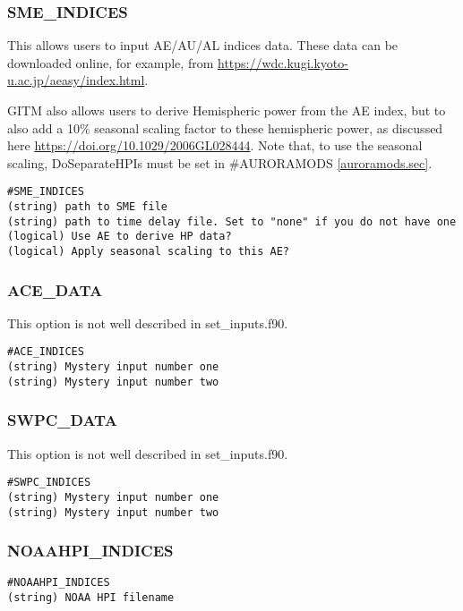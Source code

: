 \subsubsection{SME\_INDICES}
\label{sme_indices.sec}

This allows users to input AE/AU/AL indices data. These data can be downloaded online, for example, from \url{https://wdc.kugi.kyoto-u.ac.jp/aeasy/index.html}.

GITM also allows users to derive Hemispheric power from the AE index, but to also add a 10\% seasonal scaling factor to these hemispheric power, as discussed here \url{https://doi.org/10.1029/2006GL028444}. 
Note that, to use the seasonal scaling, DoSeparateHPIs must be set in #AURORAMODS \ref{auroramods.sec}.

\begin{verbatim}
#SME_INDICES
(string) path to SME file
(string) path to time delay file. Set to "none" if you do not have one
(logical) Use AE to derive HP data?
(logical) Apply seasonal scaling to this AE?
\end{verbatim}

\subsubsection{ACE\_DATA}
\label{ace_data.sec}

This option is not well described in set\_inputs.f90.

\begin{verbatim}
#ACE_INDICES
(string) Mystery input number one
(string) Mystery input number two
\end{verbatim}

\subsubsection{SWPC\_DATA}
\label{swpc_data.sec}

This option is not well described in set\_inputs.f90.

\begin{verbatim}
#SWPC_INDICES
(string) Mystery input number one
(string) Mystery input number two
\end{verbatim}

\subsubsection{NOAAHPI\_INDICES}
\label{noaahpi_indices.sec}

\begin{verbatim}
#NOAAHPI_INDICES
(string) NOAA HPI filename
\end{verbatim}


